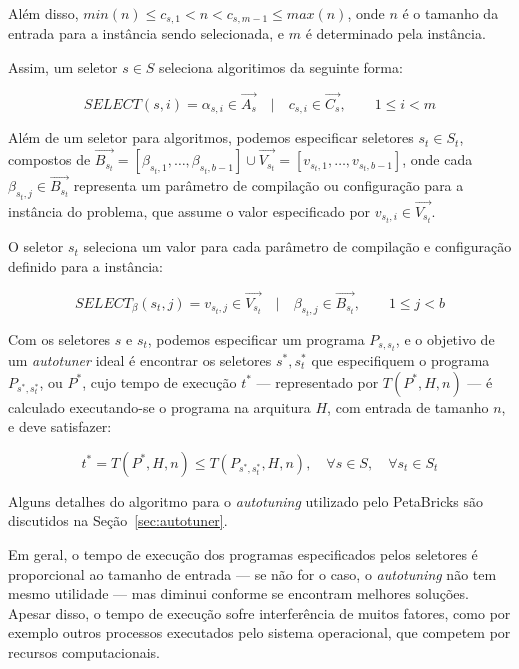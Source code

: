 \documentclass[a4paper, 11pt, twoside]{article}
\begin{document}
Além disso, $min(n) \leq c_{s,1} < n < c_{s,m-1} \leq max(n)$,
onde $n$ é o tamanho da entrada para a instância sendo selecionada, e $m$ 
é determinado pela instância.

Assim, um seletor $s \in S$ seleciona algoritimos da seguinte forma:

\begin{equation*}
    SELECT(s, i) = \alpha_{s,i} \in \overrightarrow{A_{s}} \quad | \quad c_{s,i} \in \overrightarrow{C_{s}},
    \quad\quad 1 \leq i < m
\end{equation*}

Além de um seletor para algoritmos, podemos especificar seletores $s_t \in S_t$,
compostos de $\overrightarrow{B_{s_t}} = [\beta_{s_t,1},\dots,\beta_{s_t,b-1}] 
\cup \overrightarrow{V_{s_t}} = [v_{s_t,1},\dots,v_{s_t,b-1}]$,
onde cada $\beta_{s_t,j} \in \overrightarrow{B_{s_t}}$ representa um parâmetro
de compilação ou configuração para a instância do problema, que assume o valor
especificado por $v_{s_t,i} \in \overrightarrow{V_{s_t}}$.

O seletor $s_t$ seleciona um valor para cada parâmetro de compilação e 
configuração definido para a instância:

\begin{equation*}
    SELECT_{\beta}(s_t, j) = v_{s_t,j} \in \overrightarrow{V_{s_t}} \quad | \quad \beta_{s_t,j} \in \overrightarrow{B_{s_t}},
    \quad\quad 1 \leq j < b
\end{equation*}

Com os seletores $s$ e $s_t$, podemos especificar um programa
$P_{s,s_t}$, e o objetivo de um \emph{autotuner} ideal é encontrar
os seletores $s^*,s_{t}^{*}$ que especifiquem o programa $P_{s^*,s_{t}^{*}}$, 
ou $P^*$, cujo tempo de execução $t^*$ --- representado por $T(P^*,H,n)$ --- 
é calculado executando-se o programa na arquitura $H$, com entrada de tamanho
$n$, e deve satisfazer:

\begin{equation*}
    t^* = T(P^*,H,n) \leq T(P_{s^*,s_{t}^{*}},H,n), \quad \forall s \in S, \quad \forall s_t \in S_t
\end{equation*}

Alguns detalhes do algoritmo para o \emph{autotuning} utilizado pelo PetaBricks
são discutidos na Seção~\ref{sec:autotuner}.

Em geral, o tempo de execução dos programas especificados pelos seletores
é proporcional ao tamanho de entrada --- se não for o caso, o
\emph{autotuning} não tem mesmo utilidade --- mas diminui conforme
se encontram melhores soluções. Apesar disso, o tempo de execução sofre
interferência de muitos fatores, como por exemplo outros processos executados
pelo sistema operacional, que competem por recursos computacionais.
\end{document}
